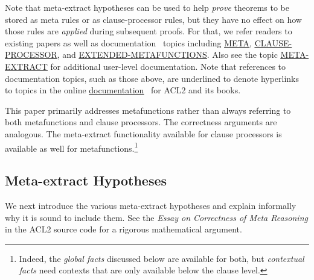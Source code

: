 Note that meta-extract hypotheses can be used to help {\em prove}
theorems to be stored as meta rules or as clause-processor rules, but
they have no effect on how those rules are {\em applied} during
subsequent proofs.  For that, we refer readers to existing papers
\cite{meta-05,trusted-cl-proc} as well as
documentation~\cite{acl2:doc} topics including
\href{http://www.cs.utexas.edu/users/moore/acl2/manuals/current/manual/index.html?topic=ACL2\_\_\_\_META}{\underline{META}},
\href{http://www.cs.utexas.edu/users/moore/acl2/manuals/current/manual/index.html?topic=ACL2\_\_\_\_CLAUSE-PROCESSOR}{\underline{CLAUSE-PROCESSOR}},
and
\href{http://www.cs.utexas.edu/users/moore/acl2/manuals/current/manual/index.html?topic=ACL2\_\_\_\_EXTENDED-METAFUNCTIONS}{\underline{EXTENDED-METAFUNCTIONS}}.
Also see the topic
\href{http://www.cs.utexas.edu/users/moore/acl2/manuals/current/manual/index.html?topic=ACL2\_\_\_\_META-EXTRACT}{\underline{META-EXTRACT}}
for additional user-level documentation.  Note that references to
documentation topics, such as those above, are underlined to denote
hyperlinks to topics in the online
\href{http://www.cs.utexas.edu/users/moore/acl2/manuals/current/manual/index.html}{\underline{documentation}}~\cite{acl2:doc}
for ACL2 and its books.

This paper primarily addresses metafunctions rather than always
referring to both metafunctions and clause processors.  The
correctness arguments are analogous.  The meta-extract functionality
available for clause processors is available as well for
metafunctions.\footnote{Indeed, the {\em global facts} discussed below
  are available for both, but {\em contextual facts} need contexts
  that are only available below the clause level.}

\subsection{Meta-extract Hypotheses}
\label{sec:intuitive}

We next introduce the various meta-extract hypotheses and
explain informally why it is sound to include them.
See the {\em Essay on Correctness of Meta Reasoning} in
the ACL2 source code for a rigorous mathematical argument.

